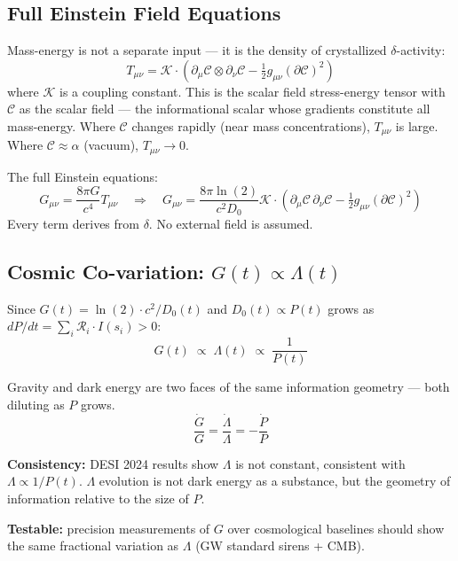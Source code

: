 \documentclass[12pt, a4paper]{article}
\begin{document}
\subsection{Full Einstein Field Equations}

\begin{derivedbox}[title={$T_{\mu\nu}$ from Constraint-Density Gradients}]
Mass-energy is not a separate input --- it is the density of crystallized $\delta$-activity:
\[
  T_{\mu\nu} = \mathcal{K}\cdot\left(
    \partial_\mu\mathcal{C}\otimes\partial_\nu\mathcal{C}
    - \tfrac{1}{2}g_{\mu\nu}(\partial\mathcal{C})^2
  \right)
\]
where $\mathcal{K}$ is a coupling constant. This is the scalar field stress-energy tensor
with $\mathcal{C}$ as the scalar field --- the informational scalar whose gradients constitute
all mass-energy. Where $\mathcal{C}$ changes rapidly (near mass concentrations),
$T_{\mu\nu}$ is large. Where $\mathcal{C} \approx \alpha$ (vacuum), $T_{\mu\nu} \to 0$.

The full Einstein equations:
\[
  G_{\mu\nu} = \frac{8\pi G}{c^4}T_{\mu\nu}
  \quad\Rightarrow\quad
  G_{\mu\nu} = \frac{8\pi\ln(2)}{c^2 D_0}\mathcal{K}\cdot
  \left(\partial_\mu\mathcal{C}\,\partial_\nu\mathcal{C}
  - \tfrac{1}{2}g_{\mu\nu}(\partial\mathcal{C})^2\right)
\]
Every term derives from $\delta$. No external field is assumed.
\end{derivedbox}

\subsection{Cosmic Co-variation: $G(t) \propto \Lambda(t)$}

\begin{derivedbox}[title={Cosmic Co-variation Prediction}]
Since $G(t) = \ln(2)\cdot c^2/D_0(t)$ and $D_0(t)\propto P(t)$ grows as
$dP/dt = \sum_i\mathcal{R}_i\cdot I(s_i) > 0$:
\[
  G(t) \;\propto\; \Lambda(t) \;\propto\; \frac{1}{P(t)}
\]

Gravity and dark energy are two faces of the same information geometry --- both diluting
as $P$ grows.
\[
  \frac{\dot{G}}{G} = \frac{\dot{\Lambda}}{\Lambda} = -\frac{\dot{P}}{P}
\]

\textbf{Consistency:} DESI 2024 results show $\Lambda$ is not constant, consistent with
$\Lambda\propto 1/P(t)$. $\Lambda$ evolution is not dark energy as a substance, but the
geometry of information relative to the size of $P$.

\textbf{Testable:} precision measurements of $G$ over cosmological baselines should show
the same fractional variation as $\Lambda$ (GW standard sirens + CMB).
\end{derivedbox}
\end{document}
